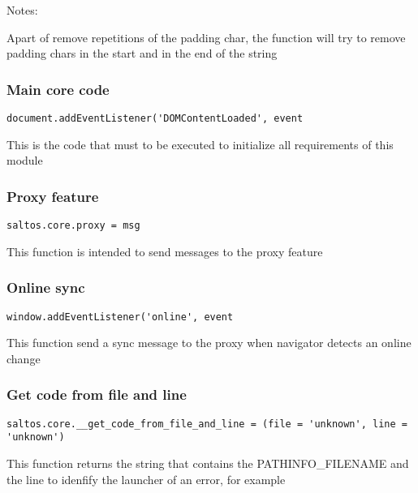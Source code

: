 \documentclass[a4paper]{article}
\begin{document}
Notes:

Apart of remove repetitions of the padding char, the function will try to
remove padding chars in the start and in the end of the string

\hypertarget{toc715}{}
\subsubsection{Main core code}

\begin{lstlisting}
document.addEventListener('DOMContentLoaded', event
\end{lstlisting}

This is the code that must to be executed to initialize all requirements of this module

\hypertarget{toc716}{}
\subsubsection{Proxy feature}

\begin{lstlisting}
saltos.core.proxy = msg
\end{lstlisting}

This function is intended to send messages to the proxy feature

\hypertarget{toc717}{}
\subsubsection{Online sync}

\begin{lstlisting}
window.addEventListener('online', event
\end{lstlisting}

This function send a sync message to the proxy when navigator detects an online change

\hypertarget{toc718}{}
\subsubsection{Get code from file and line}

\begin{lstlisting}
saltos.core.__get_code_from_file_and_line = (file = 'unknown', line = 'unknown')
\end{lstlisting}

This function returns the string that contains the PATHINFO\_FILENAME and the line to idenfify
the launcher of an error, for example
\end{document}
